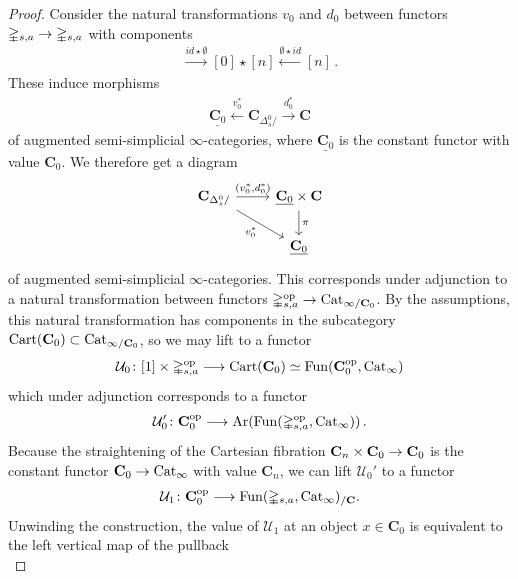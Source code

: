 \documentclass[10pt]{amsart}
\numberwithin{equation}{section}
\theoremstyle{definition}
\DeclareMathOperator{\Fun}{Fun}
\DeclareMathOperator{\op}{op}
\DeclareMathOperator{\Ar}{Ar}
\DeclareMathOperator{\Cart}{Cart}
\newcommand{\Cat}{\mathrm{Cat}\vphantom{t}}
\newcommand{\Simp}{\mathbb{\Delta}}
\newcommand{\cU}{\mathcal{U}}
\newcommand{\bfC}{\mathbf{C}}
\newcommand{\join}{\star}
\renewcommand{\to}{\mathchoice{\longrightarrow}{\rightarrow}{}{}}
\begin{document}
	\begin{proof}
		Consider the natural transformations $v_{0}$ and $d_{0}$ between functors $\Simp_{s,a} \to \Simp_{s,a}$ with components
		\begin{align*}
			[0] \xrightarrow{id\join \emptyset } [0]\join [n] \xleftarrow{\emptyset \join id} [n] \,.
		\end{align*}
		These induce morphisms
		\begin{align*}
			\underline{\bfC_{0}} \xleftarrow{v_{0}^{*}} \bfC_{\Delta^{0}_{s}/} \xrightarrow{d_{0}^{*}} \bfC
		\end{align*}
		of augmented semi-simplicial $\infty$-categories, where $\underline{\bfC_{0}}$ is the constant functor with value $\bfC_{0}$.
    We therefore get a diagram
		\begin{equation*}
			\begin{tikzcd}
				\bfC_{\Delta^{0}_{s}/} \arrow[r, "{(v_{0}^{*},d_{0}^{*})}"] \arrow[dr, "v_{0}^{*}"']      &   \underline{\bfC_{0}}\times \bfC \arrow[d, "\pi"] \\
				&   \underline{\bfC_{0}}
			\end{tikzcd}
		\end{equation*}
		of augmented semi-simplicial $\infty$-categories.
    This corresponds under adjunction to a natural transformation between functors $\Simp_{s,a}^{\op} \to \Cat_{\infty / \bfC_{0}}$.
    By the assumptions, this natural transformation has components in the subcategory $\Cart(\bfC_{0}) \subset \Cat_{\infty /\bfC_{0}}$, so we may lift to a functor
		\begin{align*}
			\cU_{0}\colon [1] \times \Simp_{s,a}^{\op} \to \Cart(\bfC_{0}) \simeq \Fun(\bfC_{0}^{\op}, \Cat_{\infty})
		\end{align*}
		which under adjunction corresponds to a functor
		\begin{align*}
			\cU'_{0}\colon \bfC_{0}^{\op} \to \Ar(\Fun(\Simp_{s,a}^{\op},\Cat_{\infty}  ) ) \,.
		\end{align*}
		Because the straightening of the Cartesian fibration $\bfC_{n}\times \bfC_{0} \to \bfC_{0}$ is the constant functor $\bfC_{0} \to \Cat_{\infty}$ with value $\bfC_{n}$, we can lift $\cU_{0}'$ to a functor
		\begin{align*}
			\cU_{1}\colon \bfC_{0}^{\op} \to \Fun(\Simp_{s,a}, \Cat_{\infty})_{/\bfC}.
		\end{align*}
		Unwinding the construction, the value of $\cU_{1}$ at an object $x\in \bfC_{0}$ is equivalent to the left vertical map of the pullback
		\begin{equation*}

\end{equation*}
\end{proof}
\end{document}
